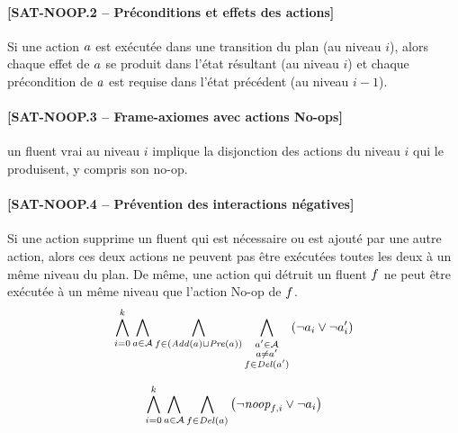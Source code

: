 \paragraph*{[SAT-NOOP.2 -- Préconditions et effets des actions]} %
Si une action $a$ est exécutée dans une transition du plan (au niveau $i$), alors chaque effet de $a$ se produit dans l'état résultant (au niveau $i$) et chaque précondition de $a$ est requise dans l'état précédent (au niveau $i-1$).


\paragraph*{[SAT-NOOP.3 -- Frame-axiomes avec actions No-ops]}
  un fluent vrai au niveau $i$ implique la disjonction des actions du niveau $i$ qui le produisent, y compris son no-op. 

\paragraph*{[SAT-NOOP.4 -- Prévention des interactions négatives]}
Si une action supprime un fluent qui est nécessaire ou est ajouté par une autre action, alors ces deux actions ne peuvent pas être exécutées toutes les deux à un même niveau du plan. De même, une action qui détruit un fluent $f$ ne peut être exécutée à un même niveau que l'action No-op de $f$.
\[ \bigwedge\limits_{\substack{i=0}}^{k} \bigwedge\limits_{\substack{a \in \mathcal{A}}} \bigwedge\limits_{\substack{f\in \left(\mathit{Add}(a) \cup \mathit{Pre}(a)\right)}} \bigwedge\limits_{\substack{a' \in \mathcal{A} \\ a \neq a' \\ f \in \mathit{Del}(a')}}\left(\neg a_{i} \vee \neg a'_{i}\right) \]

\[ \bigwedge\limits_{\substack{i=0}}^{k} \bigwedge\limits_{\substack{a\in \mathcal{A}}} \bigwedge\limits_{\substack{f \in \mathit{Del}(a)}}\left(\neg \textit{noop}_{f,i} \vee \neg a_{i}\right) \]